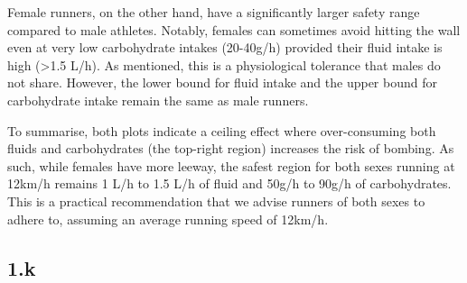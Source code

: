 \documentclass[12pt,halfline,a4paper,]{ouparticle}
\begin{document}
Female runners, on the other hand, have a significantly larger safety
range compared to male athletes. Notably, females can sometimes avoid
hitting the wall even at very low carbohydrate intakes (20-40g/h)
provided their fluid intake is high (\textgreater1.5 L/h). As mentioned,
this is a physiological tolerance that males do not share. However, the
lower bound for fluid intake and the upper bound for carbohydrate intake
remain the same as male runners.

To summarise, both plots indicate a ceiling effect where over-consuming
both fluids and carbohydrates (the top-right region) increases the risk
of bombing. As such, while females have more leeway, the safest region
for both sexes running at 12km/h remains 1 L/h to 1.5 L/h of fluid and
50g/h to 90g/h of carbohydrates. This is a practical recommendation that
we advise runners of both sexes to adhere to, assuming an average
running speed of 12km/h.

\subsection*{1.k}\label{k}
\end{document}
